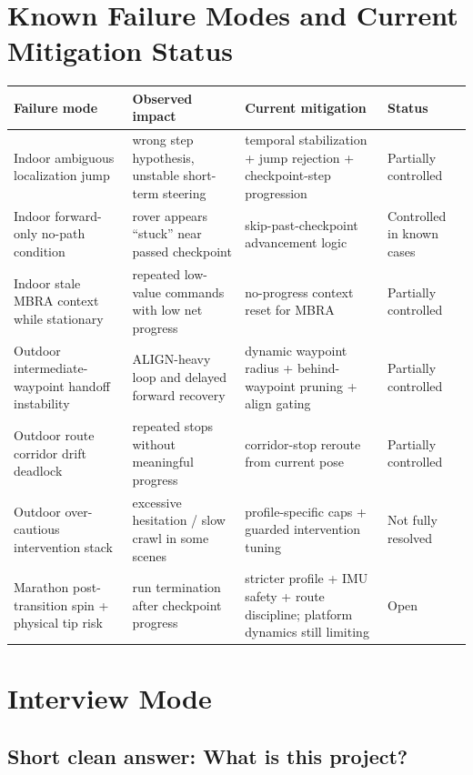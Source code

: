 \documentclass[11pt]{article}
\begin{document}
\section{Known Failure Modes and Current Mitigation Status}

\begin{longtable}{p{}p{}p{}p{}}
\toprule
\textbf{Failure mode} & \textbf{Observed impact} & \textbf{Current mitigation} & \textbf{Status} \\
\midrule
Indoor ambiguous localization jump & wrong step hypothesis, unstable short-term steering & temporal stabilization + jump rejection + checkpoint-step progression & Partially controlled \\
Indoor forward-only no-path condition & rover appears ``stuck'' near passed checkpoint & skip-past-checkpoint advancement logic & Controlled in known cases \\
Indoor stale MBRA context while stationary & repeated low-value commands with low net progress & no-progress context reset for MBRA & Partially controlled \\
Outdoor intermediate-waypoint handoff instability & ALIGN-heavy loop and delayed forward recovery & dynamic waypoint radius + behind-waypoint pruning + align gating & Partially controlled \\
Outdoor route corridor drift deadlock & repeated stops without meaningful progress & corridor-stop reroute from current pose & Partially controlled \\
Outdoor over-cautious intervention stack & excessive hesitation / slow crawl in some scenes & profile-specific caps + guarded intervention tuning & Not fully resolved \\
Marathon post-transition spin + physical tip risk & run termination after checkpoint progress & stricter profile + IMU safety + route discipline; platform dynamics still limiting & Open \\
\bottomrule
\end{longtable}

\section{Interview Mode}

\subsection{Short clean answer: What is this project?}
\end{document}
